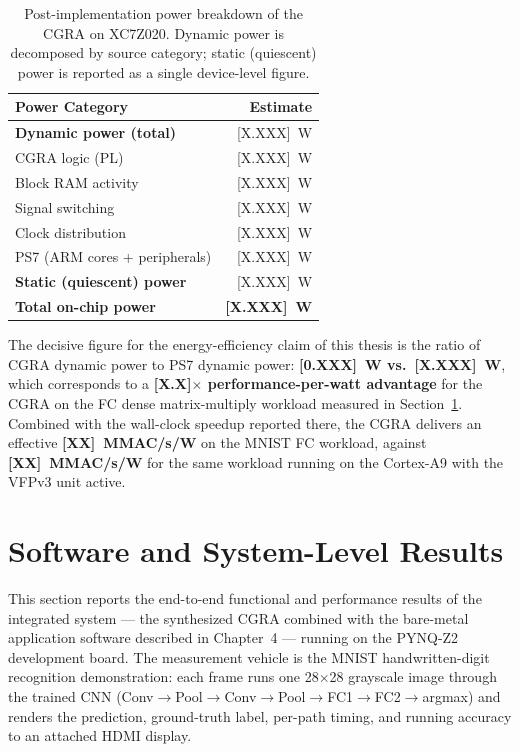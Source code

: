 \begin{table}[!htbp]
\centering
\caption{Post-implementation power breakdown of the CGRA on
XC7Z020. Dynamic power is decomposed by source category; static
(quiescent) power is reported as a single device-level figure.}
\label{tab:power}
\small
\setlength{\tabcolsep}{8pt}
\begin{tabular}{@{}l r@{}}
\toprule
\textbf{Power Category} & \textbf{Estimate} \\
\midrule
\textbf{Dynamic power (total)}             & [X.XXX]~W \\
\quad CGRA logic (PL)                      & [X.XXX]~W \\
\quad Block RAM activity                   & [X.XXX]~W \\
\quad Signal switching                     & [X.XXX]~W \\
\quad Clock distribution                   & [X.XXX]~W \\
\quad PS7 (ARM cores + peripherals)        & [X.XXX]~W \\
\textbf{Static (quiescent) power}          & [X.XXX]~W \\
\midrule
\textbf{Total on-chip power}               & \textbf{[X.XXX]~W} \\
\bottomrule
\end{tabular}
\end{table}

The decisive figure for the energy-efficiency claim of this thesis
is the ratio of CGRA dynamic power to PS7 dynamic power:
\textbf{[0.XXX]~W vs.~[X.XXX]~W}, which corresponds to a
\textbf{[X.X]$\times$ performance-per-watt advantage} for the CGRA
on the FC dense matrix-multiply workload measured in
Section~\ref{sec:ch5-sw}. Combined with the wall-clock speedup
reported there, the CGRA delivers an effective
\textbf{[XX]~MMAC/s/W} on the MNIST FC workload, against
\textbf{[XX]~MMAC/s/W} for the same workload running on the
Cortex-A9 with the VFPv3 unit active.

\section{Software and System-Level Results}
\label{sec:ch5-sw}

This section reports the end-to-end functional and performance
results of the integrated system --- the synthesized CGRA combined
with the bare-metal application software described in Chapter~4 ---
running on the PYNQ-Z2 development board. The measurement vehicle is
the MNIST handwritten-digit recognition demonstration: each frame
runs one 28$\times$28 grayscale image through the trained CNN
(Conv$\to$Pool$\to$Conv$\to$Pool$\to$FC1$\to$FC2$\to$argmax) and
renders the prediction, ground-truth label, per-path timing, and
running accuracy to an attached HDMI display.

